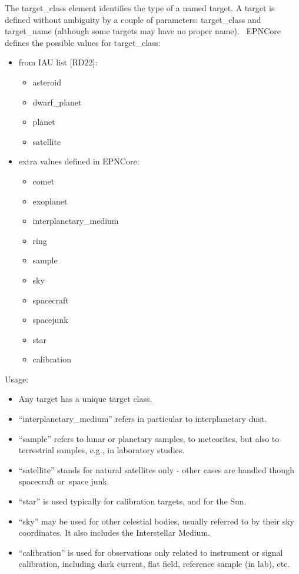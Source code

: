 \documentclass[11pt,a4paper]{ivoa}
\begin{document}
The target\_class element identifies the type of a named target. A target is defined without ambiguity by a couple of parameters: target\_class and target\_name (although some targets may have no proper name).  EPNCore defines the possible values for target\_class:

\begin{itemize}
\item from IAU list [RD22]:\begin{itemize}
\item asteroid\\
\item dwarf\_planet
\item planet
\item satellite
\end{itemize}


\item extra values defined in EPNCore:\begin{itemize}
\item comet\\
\item exoplanet
\item interplanetary\_medium
\item ring
\item sample
\item sky
\item spacecraft
\item spacejunk
\item star
\item calibration
\end{itemize}


\end{itemize}

Usage:

\begin{itemize}
\item Any target has a unique target class.
\item ``interplanetary\_medium'' refers in particular to interplanetary dust.
\item ``sample'' refers to lunar or planetary samples, to meteorites, but also to terrestrial samples, e.g., in laboratory studies.
\item ``satellite'' stands for natural satellites only - other cases are handled though spacecraft or space junk.
\item ``star'' is used typically for calibration targets, and for the Sun.
\item ``sky'' may be used for other celestial bodies, usually referred to by their sky coordinates. It also includes the Interstellar Medium.
\item ``calibration'' is used for observations only related to instrument or signal calibration, including dark current, flat field, reference sample (in lab), etc.
\end{itemize}
\end{document}
